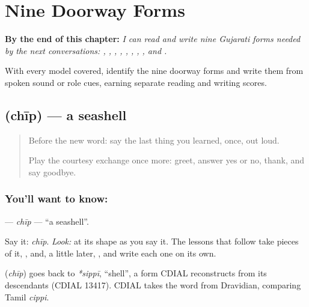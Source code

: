 
\chapter{Nine Doorway Forms}
\label{ch:gu-doorway-forms}

\begin{chapteropening}
\textbf{By the end of this chapter:} \emph{I can read and write nine Gujarati forms needed by the next conversations: , , , , , , , , and .}

With every model covered, identify the nine doorway forms and write them from spoken sound or role cues, earning separate reading and writing scores.
\end{chapteropening}

\section[\texorpdfstring{\gu{છીપ} (chīp)}{છીપ (chīp)}]{ (chīp) — a seashell}

\label{lesson:GU-C03-chhip}



\begin{quote}
Before the new word: say the last thing you learned, once, out loud.

Play the courtesy exchange once more: greet, answer yes or no, thank, and say goodbye.
\end{quote}

\subsection*{You'll want to know: }
\textbf{} — \emph{chīp} — \textquotedblleft{}a seashell\textquotedblright{}.

Say it: \emph{chīp}. \emph{Look:} at its shape as you say it. The lessons that follow take pieces of it, \textbf{}, \textbf{} and, a little later, \textbf{}, and write each one on its own.

\begin{cousinweb}
\textbf{} (\emph{chīp}) goes back to \emph{*sippī}, \textquotedblleft{}shell\textquotedblright{}, a form CDIAL reconstructs from its descendants (CDIAL 13417). CDIAL takes the word from Dravidian, comparing Tamil \emph{cippi}.
\end{cousinweb}

